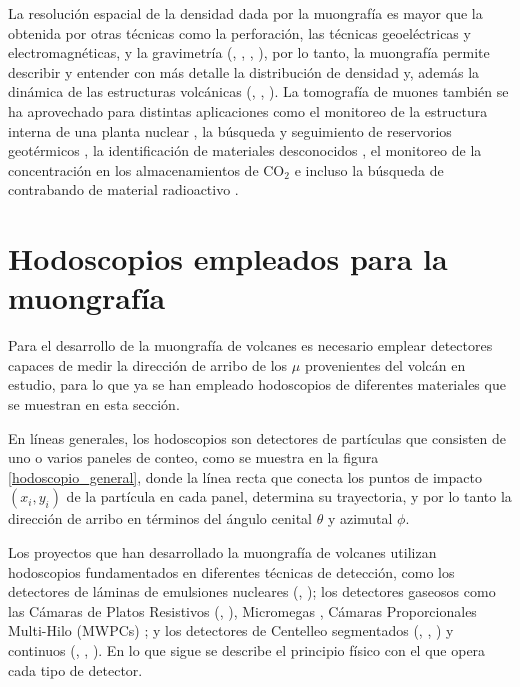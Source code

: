 \documentclass[12pt,oneside,openany,letter]{book}
\begin{document}
La resolución espacial de la densidad dada por la muongrafía es mayor que la obtenida por otras técnicas como la perforación, las técnicas geoeléctricas y electromagnéticas, y la gravimetría (\cite{Ambrosi-etal2011}, \cite{Macedonio-Martini2010}, \cite{lesparre-etal2010}, \cite{Tanaka-etal2009}), por lo tanto, la muongrafía permite describir y entender con más detalle la distribuci\'on de densidad y, adem\'as la dinámica de las estructuras volcánicas (\cite{Lesparre-etal2012-gji}, \cite{Jourde-etal2015}, \cite{Nishiyama-etal2014}). La tomografía de muones también se ha aprovechado para distintas aplicaciones como el monitoreo de la estructura interna de una planta nuclear \cite{Fujii-etal2013}, la búsqueda y seguimiento de reservorios geotérmicos \cite{Tanaka-etal2012-gi}, la identificación de materiales desconocidos \cite{Morris-etal2012}, el monitoreo de la concentraci\'on en los almacenamientos de CO$_2$ \cite{Vitaly-etal2012} e incluso la búsqueda de contrabando de material radioactivo \cite{Schultz-etal2004}. 


\section{Hodoscopios empleados para la muongrafía}\label{hodoscopios}
Para el desarrollo de la muongrafía de volcanes es necesario emplear detectores capaces de medir la dirección de arribo de los $\mu$ provenientes del volcán en estudio, para lo que ya se han empleado hodoscopios de diferentes materiales que se muestran en esta secci\'on.

En líneas generales, los hodoscopios son detectores de partículas que consisten de uno o varios paneles de conteo, como se muestra en la figura \ref{hodoscopio_general}, donde la línea recta que conecta los puntos de impacto $(x_i, y_i)$ de la partícula en cada panel, determina su trayectoria, y por lo tanto la dirección de arribo en términos del ángulo cenital $\theta$ y azimutal $\phi$. 

Los proyectos que han desarrollado la muongrafía de volcanes utilizan hodoscopios fundamentados en diferentes técnicas de detección, como los detectores de láminas de emulsiones nucleares (\cite{morishima2017discovery}, \cite{nagamine2016radiography}); los detectores gaseosos como las Cámaras de Platos Resistivos (\cite{sehgal2016simulations}, \cite{fehr2012density}), Micromegas \cite{bouteille2016micromegas}, Cámaras Proporcionales Multi-Hilo (MWPCs) \cite{olah2018high}; y los detectores de Centelleo segmentados (\cite{Fujii-etal2013}, \cite{lesparre-etal2012-gim}, \cite{Tanaka-etal2009}) y continuos (\cite{Nagamine-etal1995}, \cite{aguiar2015geant4}, \cite{tang2016large}). En lo que sigue se describe el principio f\'isico con el que opera cada tipo de detector.
\end{document}
